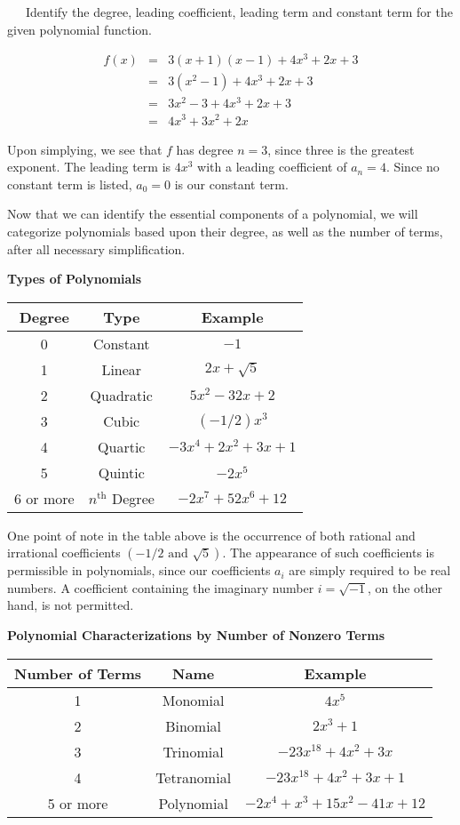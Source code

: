 \newpage

\begin{example}~~~Identify the degree, leading coefficient, leading term and constant term for the given polynomial function.

\begin{eqnarray*}
f(x) &=& 3(x+1)(x-1)+4x^3+2x+3\\
& = & 3(x^2-1)+4x^3+2x+3\\
& = & 3x^2-3+4x^3+2x+3\\
& = & 4x^3+3x^2+2x
\end{eqnarray*}

Upon simplying, we see that $f$ has degree $n=3$, since three is the greatest exponent.\pp
The leading term is $4x^3$ with a leading coefficient of $a_n=4$.\pp
Since no constant term is listed, $a_0=0$ is our constant term.
\end{example}

Now that we can identify the essential components of a polynomial, we will categorize polynomials based upon their degree, as well as the number of terms, after all necessary simplification.

\begin{center}
\textbf{Types of Polynomials}\pp
\begin{tabular}{ | c | c | c | } 
\hline
Degree & Type & Example \\ 
\hline
0 & Constant & $-1$ \\ 
\hline
1 & Linear & $2x+\sqrt{5}$ \\ 
\hline
2 & Quadratic & $5x^2 - 32x+2$ \\ 
\hline
3 & Cubic & $(-1/2)x^{3}$ \\ 
\hline
4 & Quartic & $-3x^{4} +2x^2+3x + 1$ \\ 
\hline
5  & Quintic & $-2x^5$ \\ 
\hline
6 or more  & $n^{\text{th}}$ Degree & $-2x^{7} + 52x^6 + 12$ \\ 
\hline
\end{tabular}
\end{center}
One point of note in the table above is the occurrence of both rational and irrational coefficients $\left(-1/2\text{~and~}\sqrt{5}\right)$.  The appearance of such coefficients is permissible in polynomials, since our coefficients $a_i$ are simply required to be real numbers.  A coefficient containing the imaginary number $i=\sqrt{-1}$, on the other hand, is not permitted.\
\newpage
\begin{center}
\textbf{Polynomial Characterizations by Number of Nonzero Terms}\pp
\begin{tabular}{ | c | c | c | } 
\hline
Number of Terms & Name & Example \\ 
\hline
1 & Monomial & $4x^5$ \\ 
\hline
2 & Binomial & $2x^3 +1$ \\ 
\hline
3 & Trinomial & $-23x^{18} +4x^2+3x$ \\ 
\hline
4 & Tetranomial & $-23x^{18} +4x^2+3x + 1$ \\ 
\hline
5 or more & Polynomial & $-2x^4 + x^3 +15x^2-41x + 12$ \\ 
\hline
\end{tabular}
\end{center}

